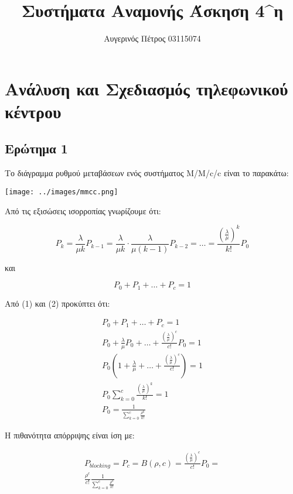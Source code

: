 \documentclass[12pt]{article}
\author{Αυγερινός Πέτρος 03115074}
\title{Συστήματα Αναμονής Άσκηση 4^η}
\date{}
\begin{document}
\maketitle 
\pagebreak

\tableofcontents
\pagebreak

\section{Ανάλυση και Σχεδιασμός τηλεφωνικού κέντρου}

\subsection{Ερώτημα 1}
Το διάγραμμα ρυθμού μεταβάσεων ενός συστήματος M/M/c/c είναι το παρακάτω:

\begin{center}
    \texttt{[image: ../images/mmcc.png]}
\end{center}

Από τις εξισώσεις ισορροπίας γνωρίζουμε ότι:

\begin{equation}
    P_k = \frac{\lambda}{\mu k} P_{k-1} = 
    \frac{\lambda}{\mu k} \cdot \frac{\lambda}{\mu (k-1)} P_{k-2} =
    \ldots = \frac{(\frac{\lambda}{\mu})^k}{k!} P_0
\end{equation}

και 

\begin{equation}
    P_0 + P_1 + \ldots + P_c = 1
\end{equation}

Από (1) και (2) προκύπτει ότι:

\begin{align*}
        P_0 + P_1 + \ldots + P_c = 1 \\
        P_0 + \frac{\lambda}{\mu}P_0 + \ldots + \frac{(\frac{\lambda}{\mu})^c}{c!}P_0 = 1 \\
        P_0(1 + \frac{\lambda}{\mu} + \ldots + \frac{(\frac{\lambda}{\mu})^c}{c!}) = 1 \\
        P_0 \sum_{k=0}^{c} \frac{(\frac{\lambda}{\mu})^k}{k!} = 1 \\
        P_0 = \frac{1}{\sum_{k=0}^{c} \frac{\rho^k}{k!}}
\end{align*}

Η πιθανότητα απόρριψης είναι ίση με: 

\begin{align*}
    P_{blocking} = P_c = B(\rho,c) = \frac{(\frac{\lambda}{\mu})^c}{c!} P_0 = \\
    \frac{\rho^c}{c!} \frac{1}{\sum_{k=0}^{c} \frac{\rho^k}{k!}} \\
\end{align*}
\end{document}

